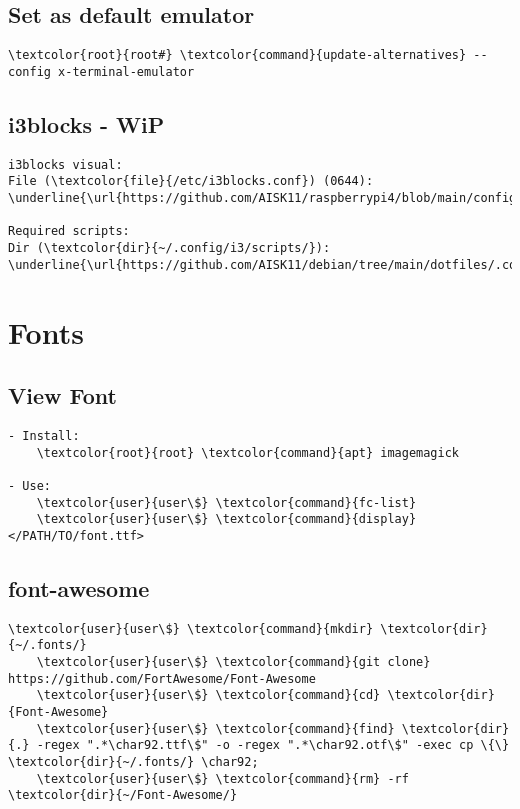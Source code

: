 \documentclass[10pt, a4paper, onecolumn, openany]{book} %
\begin{document}
\subsection{Set as default emulator}
\begin{Verbatim}[commandchars=\\\{\}]    
    \textcolor{root}{root#} \textcolor{command}{update-alternatives} --config x-terminal-emulator
\end{Verbatim}


\subsection{i3blocks - WiP}
\begin{Verbatim}[commandchars=\\\{\}]
i3blocks visual:
File (\textcolor{file}{/etc/i3blocks.conf}) (0644):
\underline{\url{https://github.com/AISK11/raspberrypi4/blob/main/config_files/i3blocks.conf}}

Required scripts:
Dir (\textcolor{dir}{~/.config/i3/scripts/}):
\underline{\url{https://github.com/AISK11/debian/tree/main/dotfiles/.config/i3/scripts}}
\end{Verbatim}

\section{Fonts}
\subsection{View Font}
\begin{Verbatim}[commandchars=\\\{\}]
- Install:
    \textcolor{root}{root} \textcolor{command}{apt} imagemagick
    
- Use:
    \textcolor{user}{user\$} \textcolor{command}{fc-list} 
    \textcolor{user}{user\$} \textcolor{command}{display} </PATH/TO/font.ttf>
\end{Verbatim}
\subsection{font-awesome}
\begin{Verbatim}[commandchars=\\\{\}]
    \textcolor{user}{user\$} \textcolor{command}{mkdir} \textcolor{dir}{~/.fonts/}
    \textcolor{user}{user\$} \textcolor{command}{git clone} https://github.com/FortAwesome/Font-Awesome
    \textcolor{user}{user\$} \textcolor{command}{cd} \textcolor{dir}{Font-Awesome}
    \textcolor{user}{user\$} \textcolor{command}{find} \textcolor{dir}{.} -regex ".*\char92.ttf\$" -o -regex ".*\char92.otf\$" -exec cp \{\} \textcolor{dir}{~/.fonts/} \char92;
    \textcolor{user}{user\$} \textcolor{command}{rm} -rf \textcolor{dir}{~/Font-Awesome/}
\end{Verbatim}
\end{document}
